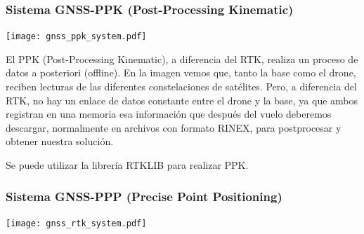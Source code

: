 \begin{frame}
    \frametitle{Sistema GNSS-PPK (Post-Processing Kinematic)}
    \begin{center}
        \texttt{[image: gnss\_ppk\_system.pdf]}
    \end{center}


    El PPK (Post-Processing Kinematic), a diferencia del RTK, realiza un proceso de datos a posteriori (offline).
    En la imagen vemos que, tanto la base como el drone, reciben lecturas de las diferentes constelaciones de satélites. 
    Pero, a diferencia del RTK, no hay un enlace de datos constante entre el drone y la base, ya que ambos registran en una memoria esa información que después del vuelo deberemos descargar, normalmente en archivos con formato RINEX, para postprocesar y obtener nuestra solución.

    Se puede utilizar la librería RTKLIB para realizar PPK.
    
\end{frame}

\begin{frame}
    \frametitle{Sistema GNSS-PPP (Precise Point Positioning)}
    \begin{center}
        \texttt{[image: gnss\_rtk\_system.pdf]}
    \end{center}

\end{frame}